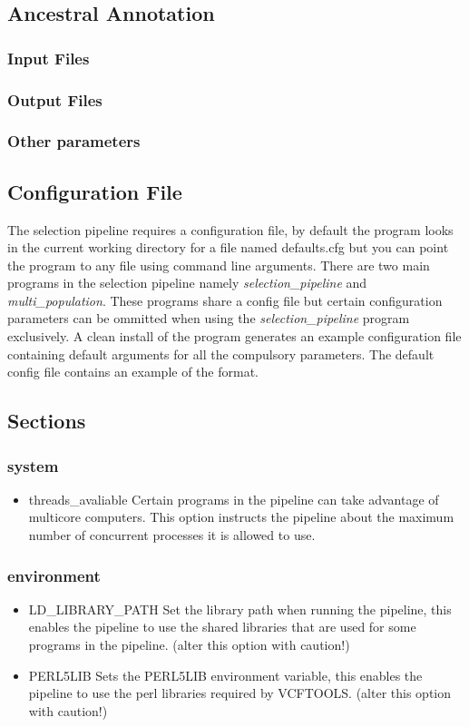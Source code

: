 \documentclass[a4paper,10pt]{article}
\begin{document}
\subsection{Ancestral Annotation}
\subsubsection{Input Files}
\subsubsection{Output Files}
\subsubsection{Other parameters}

\subsection{Configuration File}
The selection pipeline requires a configuration file, by default the program looks in the current working directory for a file named defaults.cfg but you can point the program to any file using command line arguments. There are two main programs in the selection pipeline namely \emph{selection\_pipeline} and \emph{multi\_population}. These programs share a config file but certain configuration parameters can be ommitted when using the \emph{selection\_pipeline} program exclusively. A clean install of the program generates an example configuration file containing default arguments for all the compulsory parameters. The default config file contains an example of the format.
\subsection{Sections}
\subsubsection{system}
\begin{itemize}
\item threads\_avaliable
Certain programs in the pipeline can take advantage of multicore computers. This option instructs the pipeline about the maximum number of concurrent processes it is allowed to use.
\end{itemize}
\subsubsection{environment}
\begin{itemize}
\item LD_LIBRARY_PATH
Set the library path when running the pipeline, this enables the pipeline to use the shared libraries that are used for some programs in the pipeline. (alter this option with caution!)
\item PERL5LIB
Sets the PERL5LIB environment variable, this enables the pipeline to use the perl libraries required by VCFTOOLS. (alter this option with caution!)
\end{itemize}
\end{document}
